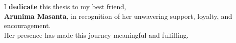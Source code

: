 \newpage
\thispagestyle{empty}
\vspace*{7.9cm}

{
    
    \LARGE
    \vspace{0.5cm}
    
    
    
    
    \parbox{0.8\textwidth}{
        \centering
        \calligra
        I \textbf{dedicate} this thesis to my best friend,\\ \textbf{\large{Arunima Masanta}},
        in recognition of her unwavering support, loyalty, and encouragement.\\
        Her presence has made this journey meaningful and fulfilling.
    }
}
\cleardoublepage
